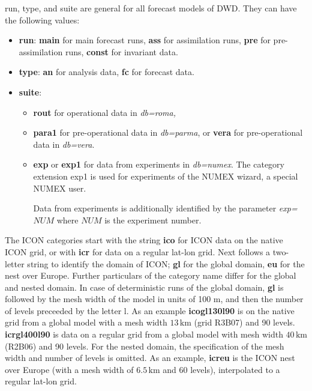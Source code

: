 run, type, and suite are general for all forecast models of DWD. They can have the 
following values:
\begin{itemize}
 \item \textbf{run}: \textbf{main} for main forecast runs,
                     \textbf{ass} for assimilation runs,
                     \textbf{pre} for pre-assimilation runs,
                     \textbf{const} for invariant data.
 \item \textbf{type}: \textbf{an} for analysis data,
                      \textbf{fc} for forecast data.
 \item \textbf{suite}: 
       \begin{itemize}
         \item \textbf{rout} for operational data in \emph{db=roma,}
         \item \textbf{para1} for pre-operational data in \emph{db=parma}, or
               \textbf{vera} for pre-operational data in \emph{db=vera}.
         \item \textbf{exp} or \textbf{exp1} for data from experiments in
                       \emph{db=numex}. The category extension exp1 is used for
                       experiments of the NUMEX wizard, a special NUMEX user.

                       Data from experiments is additionally
                       identified by the parameter \emph{exp=}$NUM$ where $NUM$ is
                       the experiment number.
       \end{itemize}
\end{itemize}

The ICON categories start with the string \textbf{ico} for ICON data on 
the native ICON grid, or with \textbf{icr} for data on a regular lat-lon grid.
Next follows a two-letter string to identify the domain of ICON; \textbf{gl} for the
global domain, \textbf{eu} for the nest over Europe. Further particulars of the category 
name differ for the global and nested domain. In case of deterministic runs of the global domain, \textbf{gl} 
is followed by the mesh width of the model in units of 100 m, and then the number of levels 
preceeded by the letter l. As an example \textbf{icogl130l90} is on the native grid from a global 
model with a mesh width $13\,\mathrm{km}$ (grid R3B07) and 90 levels.
\textbf{icrgl400l90} is data on a regular grid from a global model with mesh width $40\,\mathrm{km}$ (R2B06) and 90 levels. 
For the nested domain, the specification of the mesh width and number of levels is omitted. As an 
example, \textbf{icreu} is the ICON nest over Europe (with a mesh width of $6.5\,\mathrm{km}$ and 60 
levels), interpolated to a regular lat-lon grid.

